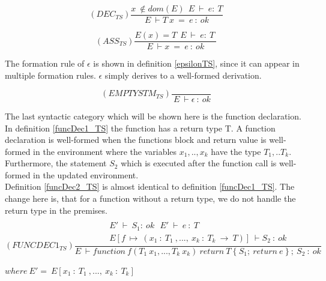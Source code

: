 \begin{equation} \label{TYPERULE:Dcl}
    (DEC_{TS})\frac{x \ \notin dom(E) \ \ E \ \vdash \ e : \ T }{E \ \vdash T \ x \ = \ e  \ : \ ok}
\end{equation}

\begin{equation}\label{TYPERULE:Ass}
    (ASS_{TS})\frac{E(x) = T \ \ E \ \vdash \ e : \ T \ }{E \ \vdash x \ = \ e \ : \ ok}
\end{equation}

\noindent The formation rule of $\epsilon$ is shown in definition \ref{epsilonTS}, since it can appear in multiple formation rules. $\epsilon$ simply derives to a well-formed derivation.

\begin{equation} \label{epsilonTS}
    (EMPTYSTM_{TS})\frac{}{\ E \ \vdash \epsilon \ : \ ok}
\end{equation}

\noindent
The last syntactic category which will be shown here is the function declaration. In definition \ref{funcDec1_TS} the function has a return type T. A function declaration is well-formed when the functions block and return value is well-formed in the environment where the variables $x_1,..,x_k$ have the type $T_1,..T_k$. Furthermore, the statement $S_2$ which is executed after the function call is well-formed in the updated environment. \\

Definition \ref{funcDec2_TS} is almost identical to definition \ref{funcDec1_TS}. The change here is, that for a function without a return type, we do not handle the return type in the premises. \\

\begin{equation} \label{funcDec1_TS}
(FUNCDEC1_{TS})\frac{\begin{array}{c}
\\ E' \ \vdash \ S_1 : \ ok \ \ \ E' \ \vdash \ e\ : \ T \ \\
E[f \ \mapsto \ 
(x_1 \ : \ T_1 \ , ... , \ x_k \ : 
\ T_k \  \rightarrow \ T)] \ \vdash S_2 \ : \ ok\end{array}  }
{E \ \vdash function \ f(T_1\ x_1 , ... , T_k\ x_k) 
\ return \ T \ \{ \ S_1; \ return \ e \ \}\ ; \ S_2 \ : \ ok}
\end{equation}
\begin{center}
    $where\ E' =\ E[x_1 \ : \ T_1 \ , ... , \ x_k \ : 
\ T_k ]$ 
\end{center}

